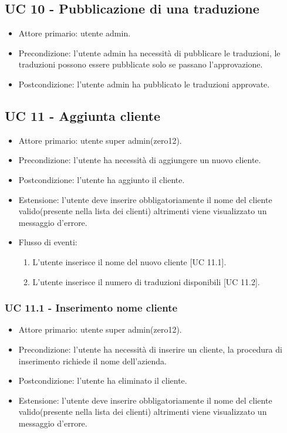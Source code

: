 \subsection{UC 10 - Pubblicazione di una traduzione}
        \begin{itemize}
            \item Attore primario: utente admin.
            \item Precondizione: l'utente admin ha necessità di pubblicare le traduzioni, le traduzioni possono essere pubblicate solo se passano l'approvazione. 
            \item Postcondizione: l'utente admin ha pubblicato le traduzioni approvate. 
        \end{itemize}
\subsection{UC 11 - Aggiunta cliente}
    \begin{itemize}
        \item Attore primario: utente super admin(zero12).
        \item Precondizione: l'utente ha necessità di aggiungere un nuovo cliente.
        \item Postcondizione: l'utente ha aggiunto il cliente.
        \item Estensione: l'utente deve inserire obbligatoriamente il nome del cliente valido(presente nella lista dei clienti) altrimenti viene visualizzato un messaggio d'errore.
        \item Flusso di eventi:
        \begin{enumerate}
            \item L'utente inserisce il nome del nuovo cliente [UC 11.1].
            \item L'utente inserisce il numero di traduzioni disponibili [UC 11.2].
        \end{enumerate}
    \end{itemize}
    \subsubsection{UC 11.1 - Inserimento nome cliente}
        \begin{itemize}
            \item Attore primario: utente super admin(zero12).
            \item Precondizione: l'utente ha necessità di inserire un cliente, la procedura di inserimento richiede il nome dell'azienda.
            \item Postcondizione: l'utente ha eliminato il cliente.
            \item Estensione: l'utente deve inserire obbligatoriamente il nome del cliente valido(presente nella lista dei clienti) altrimenti viene visualizzato un messaggio d'errore.
        \end{itemize}
